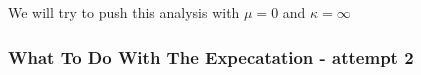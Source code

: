 \documentclass[12pt]{article}
\begin{document}
					We will try to push this analysis with $\mu=0$ and $\kappa = \infty$
		
		
		
		
		
		
		
		
		
		\newpage
		
		
		\newpage
		
		
		\subsubsection{What To Do With The Expecatation - attempt 2}
\end{document}
